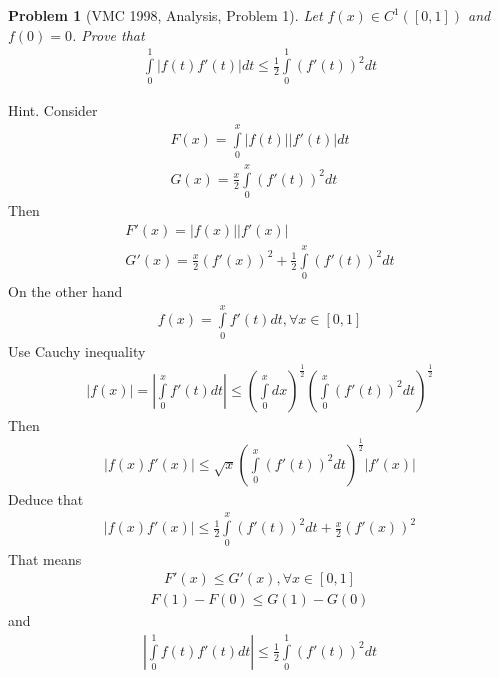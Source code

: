 \documentclass{article}
\newtheorem{problem}{Problem}
\begin{document}
\begin{problem}[VMC 1998, Analysis, Problem 1]
	Let $f\left( x \right) \in {C^1}\left( {\left[ {0,1} \right]} \right)$ and $f(0)=0$. Prove that
	\begin{align}
		\int\limits_0^1 {\left| {f\left( t \right)f'\left( t \right)} \right|} dt \le \frac{1}{2}\int\limits_0^1 {{{\left( {f'\left( t \right)} \right)}^2}} dt
	\end{align}
\end{problem}
{\sf Hint.} Consider 
\begin{align}
	F\left( x \right) = \int\limits_0^x {\left| {f\left( t \right)} \right|\left| {f'\left( t \right)} \right|} dt\\
	G\left( x \right) = \frac{x}{2}\int\limits_0^x {{{\left( {f'\left( t \right)} \right)}^2}} dt
\end{align}
Then
\begin{align}
	F'\left( x \right) = \left| {f\left( x \right)} \right|\left| {f'\left( x \right)} \right|\\
	G'\left( x \right) = \frac{x}{2}{\left( {f'\left( x \right)} \right)^2} + \frac{1}{2}\int\limits_0^x {{{\left( {f'\left( t \right)} \right)}^2}} dt
\end{align}
On the other hand
\begin{align}
	f\left( x \right) = \int\limits_0^x {f'\left( t \right)} dt,\forall x \in \left[ {0,1} \right]
\end{align}
Use Cauchy inequality
\begin{align}
	\left| {f\left( x \right)} \right| = \left| {\int\limits_0^x {f'\left( t \right)} dt} \right| \le {\left( {\int\limits_0^x {dx} } \right)^{\frac{1}{2}}}{\left( {\int\limits_0^x {{{\left( {f'\left( t \right)} \right)}^2}} dt} \right)^{\frac{1}{2}}}
\end{align}
Then 
\begin{align}
	\left| {f\left( x \right)f'\left( x \right)} \right| \le \sqrt x {\left( {\int\limits_0^x {{{\left( {f'\left( t \right)} \right)}^2}} dt} \right)^{\frac{1}{2}}}\left| {f'\left( x \right)} \right|
\end{align}
Deduce that
\begin{align}
	\left| {f\left( x \right)f'\left( x \right)} \right| \le \frac{1}{2}\int\limits_0^x {{{\left( {f'\left( t \right)} \right)}^2}dt}  + \frac{x}{2}{\left( {f'\left( x \right)} \right)^2}
\end{align}
That means
\begin{align}
	F'\left( x \right) \le G'\left( x \right),\forall x \in \left[ {0,1} \right]
\end{align}
\begin{align}
	F\left( 1 \right) - F\left( 0 \right) \le G\left( 1 \right) - G\left( 0 \right)
\end{align}
and
\begin{align}
	\left| {\int\limits_0^1 {f\left( t \right)f'\left( t \right)} dt} \right| \le \frac{1}{2}\int\limits_0^1 {{{\left( {f'\left( t \right)} \right)}^2}} dt
\end{align}
\end{document}
